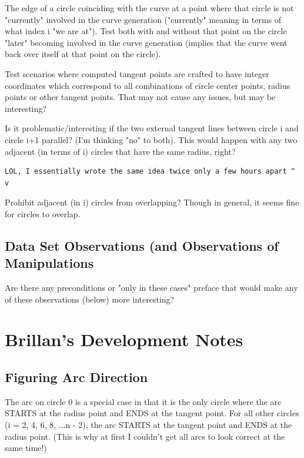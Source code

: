 \documentclass[sigconf]{acmart}
\begin{document}
The edge of a circle coinciding with the curve at a point where that circle is not "currently" involved in the curve generation ("currently" meaning in terms of what index i "we are at"). Test both with and without that point on the circle "later" becoming involved in the curve generation (implies that the curve went back over itself at that point on the circle).

Test scenarios where computed tangent points are crafted to have integer coordinates which correspond to all combinations of circle center points, radius points or other tangent points. That may not cause any issues, but may be interesting?



Is it problematic/interesting if the two external tangent lines between circle i and circle i+1 parallel? (I'm thinking "no" to both). This would happen with any two adjacent (in terms of i) circles that have the same radius, right?






\begin{verbatim}
LOL, I essentially wrote the same idea twice only a few hours apart ^ v
\end{verbatim}

Prohibit adjacent (in i) circles from overlapping? Though in general, it seems fine for circles to overlap.




\subsection{Data Set Observations (and Observations of Manipulations}

Are there any preconditions or "only in these cases" preface that would make any of these observations (below) more interesting?








\section{Brillan's Development Notes}

\subsection{Figuring Arc Direction}
The arc on circle 0 is a special case in that it is the only circle where the arc STARTS at the radius point and ENDS at the tangent point. For all other circles (i = 2, 4, 6, 8, ...n - 2), the arc STARTS at the tangent point and ENDS at the radius point.
(This is why at first I couldn't get all arcs to look correct at the same time!)
\end{document}
